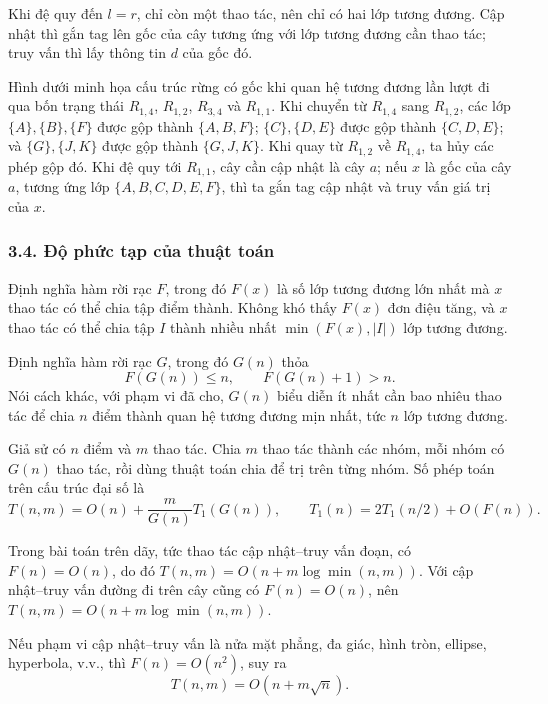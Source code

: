 \documentclass[11pt]{article}
\begin{document}
Khi đệ quy đến \(l=r\), chỉ còn một thao tác, nên chỉ có hai lớp tương đương.
Cập nhật thì gắn tag lên gốc của cây tương ứng với lớp tương đương cần thao
tác; truy vấn thì lấy thông tin \(d\) của gốc đó.

Hình dưới minh họa cấu trúc rừng có gốc khi quan hệ tương đương lần lượt đi qua
bốn trạng thái \(R_{1,4}\), \(R_{1,2}\), \(R_{3,4}\) và
\(R_{1,1}\). Khi chuyển từ \(R_{1,4}\) sang \(R_{1,2}\), các lớp
\(\{A\},\{B\},\{F\}\) được gộp thành \(\{A,B,F\}\);
\(\{C\},\{D,E\}\) được gộp thành \(\{C,D,E\}\); và \(\{G\},\{J,K\}\) được gộp
thành \(\{G,J,K\}\). Khi quay từ \(R_{1,2}\) về \(R_{1,4}\), ta hủy các phép
gộp đó. Khi đệ quy tới \(R_{1,1}\), cây cần cập nhật là cây \(a\); nếu \(x\) là
gốc của cây \(a\), tương ứng lớp \(\{A,B,C,D,E,F\}\), thì ta gắn tag cập nhật
và truy vấn giá trị của \(x\).


\subsubsection*{3.4. Độ phức tạp của thuật toán}

Định nghĩa hàm rời rạc \(F\), trong đó \(F(x)\) là số lớp tương đương lớn nhất
mà \(x\) thao tác có thể chia tập điểm thành. Không khó thấy \(F(x)\) đơn điệu
tăng, và \(x\) thao tác có thể chia tập \(I\) thành nhiều nhất
\(\min(F(x),|I|)\) lớp tương đương.

Định nghĩa hàm rời rạc \(G\), trong đó \(G(n)\) thỏa
\[
  F(G(n))\le n,\qquad F(G(n)+1)>n.
\]
Nói cách khác, với phạm vi đã cho, \(G(n)\) biểu diễn ít nhất cần bao nhiêu
thao tác để chia \(n\) điểm thành quan hệ tương đương mịn nhất, tức \(n\) lớp
tương đương.

Giả sử có \(n\) điểm và \(m\) thao tác. Chia \(m\) thao tác thành các nhóm, mỗi
nhóm có \(G(n)\) thao tác, rồi dùng thuật toán chia để trị trên từng nhóm. Số
phép toán trên cấu trúc đại số là
\[
  T(n,m)=O(n)+\frac{m}{G(n)}T_1(G(n)),\qquad
  T_1(n)=2T_1(n/2)+O(F(n)).
\]

Trong bài toán trên dãy, tức thao tác cập nhật--truy vấn đoạn, có
\(F(n)=O(n)\), do đó \(T(n,m)=O(n+m\log\min(n,m))\). Với cập nhật--truy vấn
đường đi trên cây cũng có \(F(n)=O(n)\), nên
\(T(n,m)=O(n+m\log\min(n,m))\).

Nếu phạm vi cập nhật--truy vấn là nửa mặt phẳng, đa giác, hình tròn, ellipse,
hyperbola, v.v., thì \(F(n)=O(n^2)\), suy ra
\[
  T(n,m)=O(n+m\sqrt n).
\]
\end{document}
